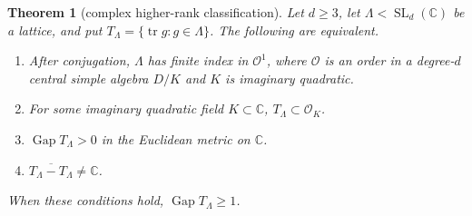 \documentclass[11pt,reqno]{amsart}
\newtheorem{theorem}{Theorem}[section]
\theoremstyle{definition}
\theoremstyle{remark}
\newcommand{\C}{\mathbb C}
\newcommand{\cO}{\mathcal O}
\newcommand{\Tr}{\operatorname{tr}}
\newcommand{\Gap}{\operatorname{Gap}}
\newcommand{\SL}{\operatorname{SL}}
\begin{document}
\begin{theorem}[complex higher-rank classification]\label{thm:complex}
Let \(d\ge3\), let \(\Lambda<\SL_d(\C)\) be a lattice, and put
\(T_\Lambda=\{\Tr g:g\in\Lambda\}\).  The following are equivalent.
\begin{enumerate}[label=\textup{(\arabic*)}]
\item After conjugation, \(\Lambda\) has finite index in \(\cO^1\), where
\(\cO\) is an order in a degree-\(d\) central simple algebra \(D/K\) and
\(K\) is imaginary quadratic.
\item For some imaginary quadratic field \(K\subset\C\),
\(T_\Lambda\subset\cO_K\).
\item \(\Gap T_\Lambda>0\) in the Euclidean metric on \(\C\).
\item \(\overline{T_\Lambda-T_\Lambda}\ne\C\).
\end{enumerate}
When these conditions hold, \(\Gap T_\Lambda\ge1\).
\end{theorem}
\end{document}
